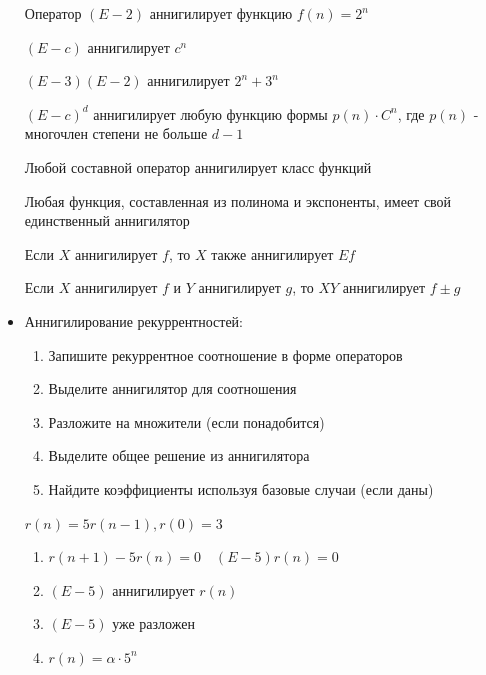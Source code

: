 \documentclass[12pt]{article}
\begin{document}
\begin{itemize}
        \Ex Оператор $(E - 2)$ аннигилирует функцию $f(n) = 2^n$

        \Exs $(E - c)$ аннигилирует $c^n$

        \Exs $(E - 3)(E - 2)$ аннигилирует $2^n + 3^n$

        \Exs $(E - c)^d$ аннигилирует любую функцию формы $p(n) \cdot C^n$, где $p(n)$ - многочлен степени не больше $d - 1$

        \Nota Любой составной оператор аннигилирует класс функций

        \Notas Любая функция, составленная из полинома и экспоненты, имеет свой единственный аннигилятор

        Если $X$ аннигилирует $f$, то $X$ также аннигилирует $Ef$

        Если $X$ аннигилирует $f$ и $Y$ аннигилирует $g$, то $XY$ аннигилирует $f \pm g$

        \mediumvspace

        \item Аннигилирование рекуррентностей:

        \begin{enumerate}
            \item Запишите рекуррентное соотношение в форме операторов

            \item Выделите аннигилятор для соотношения

            \item Разложите на множители (если понадобится)

            \item Выделите общее решение из аннигилятора

            \item Найдите коэффициенты используя базовые случаи (если даны)
        \end{enumerate}

        \Ex $r(n) = 5r(n - 1), r(0) = 3$

        \begin{enumerate}
            \item $r(n + 1) - 5r(n) = 0 \quad (E - 5)r(n) = 0$

            \item $(E - 5)$ аннигилирует $r(n)$

            \item $(E - 5)$ уже разложен

            \item $r(n) = \alpha \cdot 5^n$


\end{enumerate}
\end{itemize}
\end{document}
